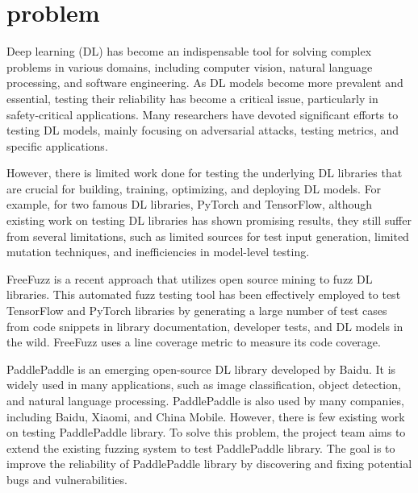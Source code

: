 \documentclass[sigconf]{acmart}
\begin{document}


\maketitle

\section{problem}
Deep learning (DL) has become an indispensable tool for solving complex problems in various domains, including computer vision\cite{p1,p2}, natural language processing\cite{p3,p4}, and software engineering\cite{p5,p6,p7,p8}. 
As DL models become more prevalent and essential, testing their reliability has become a critical issue, particularly in safety-critical applications. 
Many researchers have devoted significant efforts to testing DL models, mainly focusing on adversarial attacks\cite{p9,p10,p11}, testing metrics\cite{p12,p13,p14}, and specific applications\cite{p15,p16,p17}. 

However, there is limited work done for testing the underlying DL libraries that are crucial for building, training, optimizing, and deploying DL models. 
For example, for two famous DL libraries, PyTorch and TensorFlow, although existing work on testing DL libraries has shown promising results, 
they still suffer from several limitations, such as limited sources for test input generation, limited mutation techniques, and inefficiencies in model-level testing\cite{p18,p19}. 

FreeFuzz is a recent approach that utilizes open source mining to fuzz DL libraries\cite{w1}. 
This automated fuzz testing tool has been effectively employed to test TensorFlow and PyTorch libraries by generating a large number of test cases from code snippets in library documentation, developer tests, and DL models in the wild. 
FreeFuzz uses a line coverage metric to measure its code coverage.

PaddlePaddle is an emerging open-source DL library developed by Baidu\cite{p20}.
It is widely used in many applications, such as image classification, object detection, and natural language processing.
PaddlePaddle is also used by many companies, including Baidu, Xiaomi, and China Mobile.
However, there is few existing work on testing PaddlePaddle library. To solve this problem, the project team aims to extend the existing fuzzing system to test PaddlePaddle library. 
The goal is to improve the reliability of PaddlePaddle library by discovering and fixing potential bugs and vulnerabilities. 
 
\end{document}

